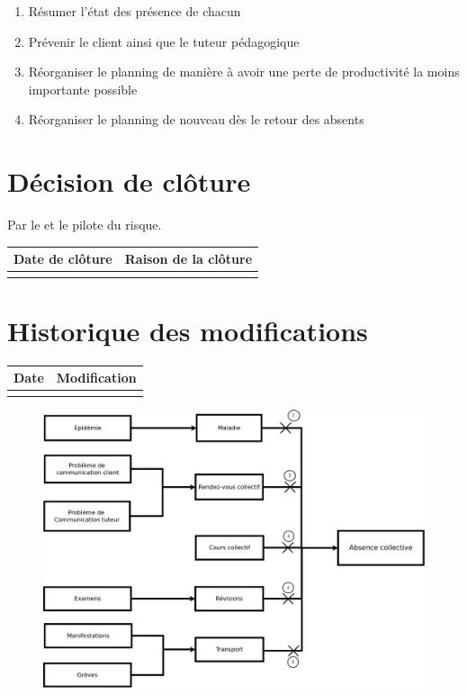 \begin{enumerate}
	\item Résumer l'état des présence de chacun
	\item Prévenir le client ainsi que le tuteur pédagogique
	\item Réorganiser le planning de manière à avoir une perte de productivité la moins importante possible
	\item Réorganiser le planning de nouveau dès le retour des absents
\end{enumerate}

\section*{Décision de clôture}
Par le \CP{} et le pilote du risque.
\begin{table}[H]
\centering
	\begin{tabularx}{12.8cm}{|X|X|}
	\hline
	\rowcolor{gray!40} Date de clôture & Raison de la clôture \\
	\hline
	  & \\
	\hline
	\end{tabularx}
\end{table}

\section*{Historique des modifications}
\begin{table}[H]
\centering
	\begin{tabularx}{12.8cm}{|X|X|}
	\hline
	\rowcolor{gray!40} Date & Modification \\
	\hline
	  & \\
	\hline
	\end{tabularx}
\end{table}
\newpage


\begin{figure}
	\centering
	\includegraphics[scale=0.30]{images/AnalyseRisque_nPourquoi_FDR003}
\end{figure}